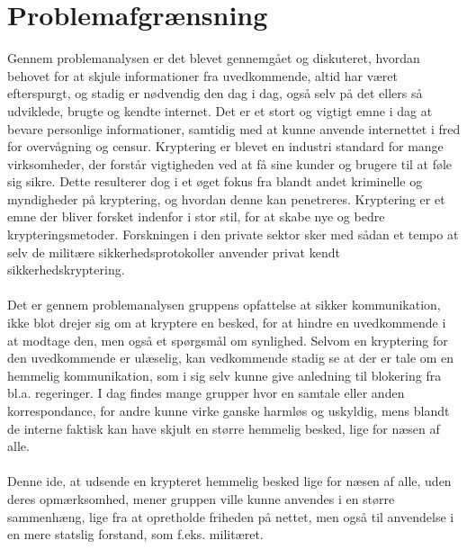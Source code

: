 \section{Problemafgrænsning}
Gennem problemanalysen er det blevet gennemgået og diskuteret, hvordan behovet for at skjule informationer fra uvedkommende, altid har været efterspurgt, og stadig er nødvendig den dag i dag, også selv på det ellers så udviklede, brugte og kendte internet. Det er et stort og vigtigt emne i dag at bevare personlige informationer, samtidig med at kunne anvende internettet i fred for overvågning og censur. Kryptering er blevet en industri standard for mange virksomheder, der forstår vigtigheden ved at få sine kunder og brugere til at føle sig sikre. Dette resulterer dog i et øget fokus fra blandt andet kriminelle og myndigheder på kryptering, og hvordan denne kan penetreres.
Kryptering er et emne der bliver forsket indenfor i stor stil, for at skabe nye og bedre krypteringsmetoder. Forskningen i den private sektor sker med sådan et tempo at selv de militære sikkerhedsprotokoller anvender privat kendt sikkerhedskryptering.\cite{ForsvaretsSikkerhed}
\\\\
Det er gennem problemanalysen gruppens opfattelse at sikker kommunikation, ikke blot drejer sig om at kryptere en besked, for at hindre en uvedkommende i at modtage den, men også et spørgsmål om synlighed. Selvom en kryptering for den uvedkommende er ulæselig, kan vedkommende stadig se at der er tale om en hemmelig kommunikation, som i sig selv kunne give anledning til blokering fra bl.a. regeringer. I dag findes mange grupper hvor en samtale eller anden korrespondance, for andre kunne virke ganske harmløs og uskyldig, mens blandt de interne faktisk kan have skjult en større hemmelig besked, lige for næsen af alle.
\\\\
Denne ide, at udsende en krypteret hemmelig besked lige for næsen af alle, uden deres opmærksomhed, mener gruppen ville kunne anvendes i en større sammenhæng, lige fra at opretholde friheden på nettet, men også til anvendelse i en mere statslig forstand, som f.eks. militæret.
